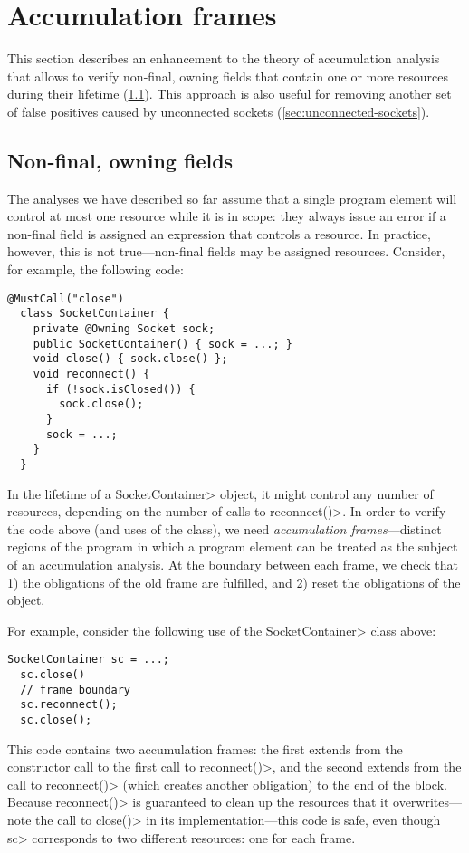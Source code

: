 \section{Accumulation frames}
\label{sec:reset-must-call}

This section describes an enhancement to the theory of accumulation
analysis that allows \Tool to verify non-final, owning fields
that contain one or more resources during their lifetime
(\cref{sec:non-final-owning}).
This approach is also useful for
removing another set of false positives caused by unconnected sockets
(\cref{sec:unconnected-sockets}).

\subsection{Non-final, owning fields}
\label{sec:non-final-owning}

The analyses we have described so far assume that a single program
element will control at most one resource while it is in scope:
they always issue an error if a non-final field is assigned an expression
that controls a resource.
In practice, however, this is not true---non-final fields
may be assigned resources. Consider, for example,
the following code:

\begin{lstlisting}[frame=tb,belowskip=3mm]
  @MustCall("close")
  class SocketContainer {
    private @Owning Socket sock;
    public SocketContainer() { sock = ...; } 
    void close() { sock.close() };
    void reconnect() {
      if (!sock.isClosed()) {
        sock.close();
      }
      sock = ...;
    }
  }
\end{lstlisting}
In the lifetime of a \<SocketContainer> object, it might control any
number of resources, depending on the number of calls to
\<reconnect()>. In order to verify the code above (and uses of the
class), we need \emph{accumulation frames}---distinct regions of the program in
which a program element can be treated as the subject of an
accumulation analysis. At the boundary between each frame, we check
that 1) the obligations of the old frame are fulfilled, and 2)
reset the obligations of the object.

For example, consider the following use of the \<SocketContainer> class
above:

\begin{lstlisting}[frame=tb,belowskip=3mm]
  SocketContainer sc = ...;
  sc.close()
  // frame boundary
  sc.reconnect();
  sc.close();
\end{lstlisting}
This code contains two accumulation frames: the first extends from the
constructor call to the first call to \<reconnect()>, and the second
extends from the call to \<reconnect()> (which creates another
obligation) to the end of the block. Because \<reconnect()> is guaranteed
to clean up the resources that it overwrites---note the call
to \<close()> in its implementation---this code is safe, even though \<sc>
corresponds to two different resources: one for each frame.

